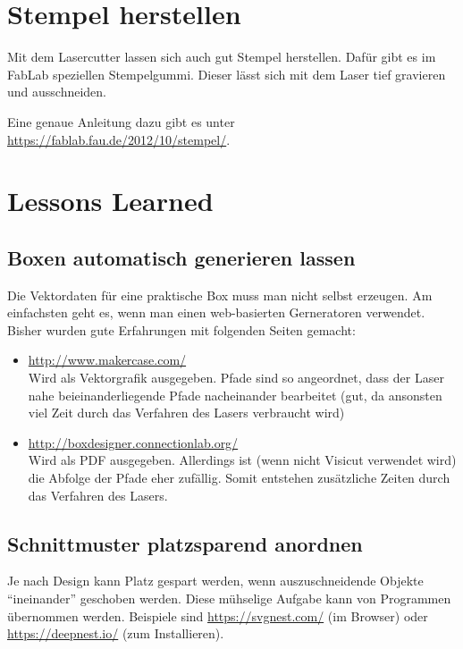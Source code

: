 \documentclass{\basedir/fablab-document}
\begin{document}
	\section{Stempel herstellen}
	\label{stempel}
	Mit dem Lasercutter lassen sich auch gut Stempel herstellen.
	Dafür gibt es im FabLab speziellen Stempelgummi.
	Dieser lässt sich mit dem Laser tief gravieren und ausschneiden.

	Eine genaue Anleitung dazu gibt es unter \url{https://fablab.fau.de/2012/10/stempel/}.

	\section{Lessons Learned}

	\subsection{Boxen automatisch generieren lassen}

	Die Vektordaten für eine praktische Box muss man nicht selbst erzeugen. Am einfachsten geht es, wenn man einen web-basierten Gerneratoren verwendet. \\

	Bisher wurden gute Erfahrungen mit folgenden Seiten gemacht:
	\begin{itemize}
		\item \url{http://www.makercase.com/} \\
		Wird als Vektorgrafik ausgegeben. Pfade sind so angeordnet, dass der Laser nahe beieinanderliegende Pfade nacheinander bearbeitet (gut, da ansonsten viel Zeit durch das Verfahren des Lasers verbraucht wird)
		\item \url{http://boxdesigner.connectionlab.org/} \\
		Wird als PDF ausgegeben. Allerdings ist (wenn nicht Visicut verwendet wird) die Abfolge der Pfade eher zufällig. Somit entstehen zusätzliche Zeiten durch das Verfahren des Lasers.
	\end{itemize}


	\subsection{Schnittmuster platzsparend anordnen}
	Je nach Design kann Platz gespart werden, wenn auszuschneidende Objekte
	\enquote{ineinander} geschoben werden.
	Diese mühselige Aufgabe kann von Programmen übernommen werden.
	Beispiele sind \url{https://svgnest.com/} (im Browser) oder \url{https://deepnest.io/} (zum Installieren).
\end{document}
